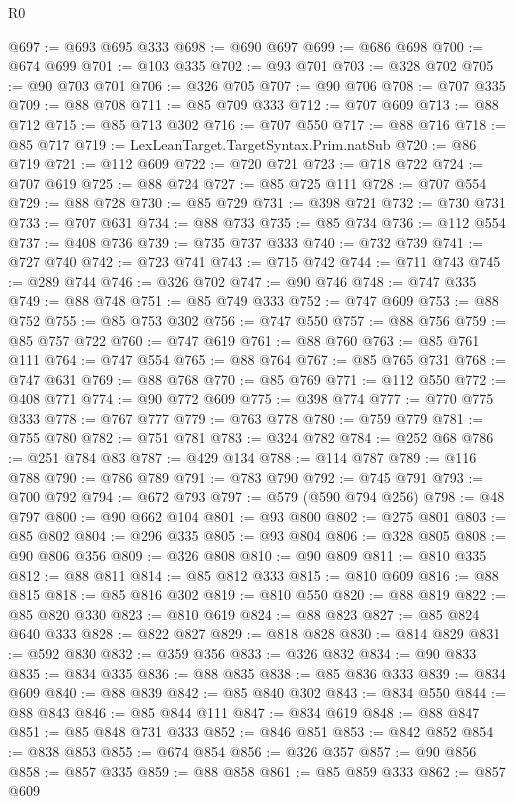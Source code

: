 \begin{lexlean}{R0}
\begin{coremodule}
@697 := @693 @695 @333
@698 := @690 @697
@699 := @686 @698
@700 := @674 @699
@701 := @103 @335
@702 := @93 @701
@703 := @328 @702
@705 := @90 @703 @701
@706 := @326 @705
@707 := @90 @706
@708 := @707 @335
@709 := @88 @708
@711 := @85 @709 @333
@712 := @707 @609
@713 := @88 @712
@715 := @85 @713 @302
@716 := @707 @550
@717 := @88 @716
@718 := @85 @717
@719 := LexLeanTarget.TargetSyntax.Prim.natSub
@720 := @86 @719
@721 := @112 @609
@722 := @720 @721
@723 := @718 @722
@724 := @707 @619
@725 := @88 @724
@727 := @85 @725 @111
@728 := @707 @554
@729 := @88 @728
@730 := @85 @729
@731 := @398 @721
@732 := @730 @731
@733 := @707 @631
@734 := @88 @733
@735 := @85 @734
@736 := @112 @554
@737 := @408 @736
@739 := @735 @737 @333
@740 := @732 @739
@741 := @727 @740
@742 := @723 @741
@743 := @715 @742
@744 := @711 @743
@745 := @289 @744
@746 := @326 @702
@747 := @90 @746
@748 := @747 @335
@749 := @88 @748
@751 := @85 @749 @333
@752 := @747 @609
@753 := @88 @752
@755 := @85 @753 @302
@756 := @747 @550
@757 := @88 @756
@759 := @85 @757 @722
@760 := @747 @619
@761 := @88 @760
@763 := @85 @761 @111
@764 := @747 @554
@765 := @88 @764
@767 := @85 @765 @731
@768 := @747 @631
@769 := @88 @768
@770 := @85 @769
@771 := @112 @550
@772 := @408 @771
@774 := @90 @772 @609
@775 := @398 @774
@777 := @770 @775 @333
@778 := @767 @777
@779 := @763 @778
@780 := @759 @779
@781 := @755 @780
@782 := @751 @781
@783 := @324 @782
@784 := @252 @68
@786 := @251 @784 @83
@787 := @429 @134
@788 := @114 @787
@789 := @116 @788
@790 := @786 @789
@791 := @783 @790
@792 := @745 @791
@793 := @700 @792
@794 := @672 @793
@797 := @579 (@590 @794 @256)
@798 := @48 @797
@800 := @90 @662 @104
@801 := @93 @800
@802 := @275 @801
@803 := @85 @802
@804 := @296 @335
@805 := @93 @804
@806 := @328 @805
@808 := @90 @806 @356
@809 := @326 @808
@810 := @90 @809
@811 := @810 @335
@812 := @88 @811
@814 := @85 @812 @333
@815 := @810 @609
@816 := @88 @815
@818 := @85 @816 @302
@819 := @810 @550
@820 := @88 @819
@822 := @85 @820 @330
@823 := @810 @619
@824 := @88 @823
@827 := @85 @824 @640 @333
@828 := @822 @827
@829 := @818 @828
@830 := @814 @829
@831 := @592 @830
@832 := @359 @356
@833 := @326 @832
@834 := @90 @833
@835 := @834 @335
@836 := @88 @835
@838 := @85 @836 @333
@839 := @834 @609
@840 := @88 @839
@842 := @85 @840 @302
@843 := @834 @550
@844 := @88 @843
@846 := @85 @844 @111
@847 := @834 @619
@848 := @88 @847
@851 := @85 @848 @731 @333
@852 := @846 @851
@853 := @842 @852
@854 := @838 @853
@855 := @674 @854
@856 := @326 @357
@857 := @90 @856
@858 := @857 @335
@859 := @88 @858
@861 := @85 @859 @333
@862 := @857 @609

\end{coremodule}
\end{lexlean}
